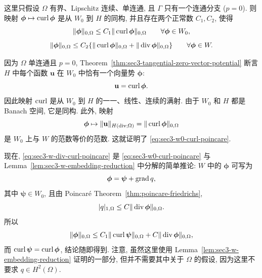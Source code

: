 
\setcounter{statement}{3}
\begin{Lemma}\label{lem:sec3-w0-curl-isomorphism}
这里只假设 $\Omega$ 有界、Lipschitz 连续、单连通, 且 $\Gamma$ 只有一个连通分支
($p=0$). 则映射 $\boldsymbol\phi\mapsto\operatorname{curl}\boldsymbol\phi$ 是从 $W_0$ 到 $H$
的同构, 并且存在两个正常数 $C_1,C_2$, 使得
\begin{equation}\label{eq:sec3-w0-curl-poincare}
\|\boldsymbol\phi\|_{0,\Omega}
\le C_1\|\operatorname{curl}\boldsymbol\phi\|_{0,\Omega}
\qquad\forall\boldsymbol\phi\in W_0,
\end{equation}
\begin{equation}\label{eq:sec3-w-div-curl-poincare}
\|\boldsymbol\phi\|_{0,\Omega}
\le C_2\{\|\operatorname{curl}\boldsymbol\phi\|_{0,\Omega}
+\|\operatorname{div}\boldsymbol\phi\|_{0,\Omega}\}
\qquad\forall\boldsymbol\phi\in W.
\end{equation}
\end{Lemma}
\begin{Proof}
因为 $\Omega$ 单连通且 $p=0$, Theorem~\ref{thm:sec3-tangential-zero-vector-potential}
断言 $H$ 中每个函数 $\mathbf u$ 在 $W_0$ 中恰有一个向量势 $\boldsymbol\phi$:
\[
\mathbf u=\operatorname{curl}\boldsymbol\phi.
\]
因此映射 $\operatorname{curl}$ 是从 $W_0$ 到 $H$ 的一一、线性、连续的满射. 由于 $W_0$ 和 $H$
都是 Banach 空间, 它是同构. 此外, 映射
\[
\boldsymbol\phi\mapsto\|\mathbf u\|_{H(\operatorname{div};\Omega)}
=\|\operatorname{curl}\boldsymbol\phi\|_{0,\Omega}
\]
是 $W_0$ 上与 $W$ 的范数等价的范数. 这就证明了
\eqref{eq:sec3-w0-curl-poincare}.

现在, \eqref{eq:sec3-w-div-curl-poincare} 是
\eqref{eq:sec3-w0-curl-poincare} 与 Lemma~\ref{lem:sec3-w-embedding-reduction}
中分解的简单推论: $W$ 中的 $\boldsymbol\phi$ 可写为
\[
\boldsymbol\phi=\boldsymbol\psi+\operatorname{grad} q,
\]
其中 $\boldsymbol\psi\in W_0$, 且由 Poincaré Theorem~\ref{thm:poincare-friedrichs},
\[
|q|_{1,\Omega}\le C\|\operatorname{div}\boldsymbol\phi\|_{0,\Omega}.
\]
所以
\[
\|\boldsymbol\phi\|_{0,\Omega}
\le C_1\|\operatorname{curl}\boldsymbol\psi\|_{0,\Omega}
+C\|\operatorname{div}\boldsymbol\phi\|_{0,\Omega},
\]
而 $\operatorname{curl}\boldsymbol\psi=\operatorname{curl}\boldsymbol\phi$, 结论随即得到.
注意, 虽然这里使用 Lemma~\ref{lem:sec3-w-embedding-reduction} 证明的一部分,
但并不需要其中关于 $\Omega$ 的假设, 因为这里不要求 $q\in H^2(\Omega)$.
\end{Proof}

